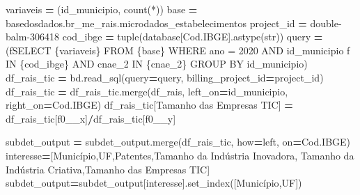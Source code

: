 \documentclass[
  12,
  dvipsnames]{article}
\newenvironment{Shaded}{\begin{snugshade}}{\end{snugshade}}
\newcommand{\BuiltInTok}[1]{#1}
\newcommand{\NormalTok}[1]{#1}
\newcommand{\OperatorTok}[1]{\textcolor[rgb]{0.81,0.36,0.00}{\textbf{#1}}}
\newcommand{\SpecialCharTok}[1]{\textcolor[rgb]{0.00,0.00,0.00}{#1}}
\newcommand{\SpecialStringTok}[1]{\textcolor[rgb]{0.31,0.60,0.02}{#1}}
\newcommand{\StringTok}[1]{\textcolor[rgb]{0.31,0.60,0.02}{#1}}
\begin{document}
\begin{Shaded}
\begin{Highlighting}[]
\NormalTok{variaveis }\OperatorTok{=}\NormalTok{ (}\StringTok{\textquotesingle{}id\_municipio, count(*)\textquotesingle{}}\NormalTok{)}
\NormalTok{base }\OperatorTok{=} \StringTok{\textquotesingle{}\textasciigrave{}basedosdados.br\_me\_rais.microdados\_estabelecimentos\textasciigrave{}\textquotesingle{}}
\NormalTok{project\_id }\OperatorTok{=} \StringTok{\textquotesingle{}double{-}balm{-}306418\textquotesingle{}}
\NormalTok{cod\_ibge }\OperatorTok{=} \BuiltInTok{tuple}\NormalTok{(database[}\StringTok{\textquotesingle{}Cod.IBGE\textquotesingle{}}\NormalTok{].astype(}\BuiltInTok{str}\NormalTok{))}
\NormalTok{query }\OperatorTok{=}\NormalTok{ (}\SpecialStringTok{f\textquotesingle{}SELECT }\SpecialCharTok{\{}\NormalTok{variaveis}\SpecialCharTok{\}}\SpecialStringTok{ FROM }\SpecialCharTok{\{}\NormalTok{base}\SpecialCharTok{\}}\SpecialStringTok{ WHERE ano = 2020 AND id\_municipio\textquotesingle{}} 
         \SpecialStringTok{f\textquotesingle{} IN }\SpecialCharTok{\{}\NormalTok{cod\_ibge}\SpecialCharTok{\}}\SpecialStringTok{ AND cnae\_2 IN }\SpecialCharTok{\{}\NormalTok{cnae\_2}\SpecialCharTok{\}}\SpecialStringTok{ GROUP BY id\_municipio\textquotesingle{}}\NormalTok{)}
\NormalTok{df\_rais\_tic }\OperatorTok{=}\NormalTok{ bd.read\_sql(query}\OperatorTok{=}\NormalTok{query, billing\_project\_id}\OperatorTok{=}\NormalTok{project\_id)}
\NormalTok{df\_rais\_tic }\OperatorTok{=}\NormalTok{ df\_rais\_tic.merge(df\_rais, left\_on}\OperatorTok{=}\StringTok{\textquotesingle{}id\_municipio\textquotesingle{}}\NormalTok{, right\_on}\OperatorTok{=}\StringTok{\textquotesingle{}Cod.IBGE\textquotesingle{}}\NormalTok{)}
\NormalTok{df\_rais\_tic[}\StringTok{\textquotesingle{}Tamanho das Empresas TIC\textquotesingle{}}\NormalTok{] }\OperatorTok{=}\NormalTok{ df\_rais\_tic[}\StringTok{\textquotesingle{}f0\_\_x\textquotesingle{}}\NormalTok{]}\OperatorTok{/}\NormalTok{df\_rais\_tic[}\StringTok{\textquotesingle{}f0\_\_y\textquotesingle{}}\NormalTok{]}

\NormalTok{subdet\_output }\OperatorTok{=}\NormalTok{ subdet\_output.merge(df\_rais\_tic, how}\OperatorTok{=}\StringTok{\textquotesingle{}left\textquotesingle{}}\NormalTok{, on}\OperatorTok{=}\StringTok{\textquotesingle{}Cod.IBGE\textquotesingle{}}\NormalTok{)}
\NormalTok{interesse}\OperatorTok{=}\NormalTok{[}\StringTok{\textquotesingle{}Município\textquotesingle{}}\NormalTok{,}\StringTok{\textquotesingle{}UF\textquotesingle{}}\NormalTok{,}\StringTok{\textquotesingle{}Patentes\textquotesingle{}}\NormalTok{,}\StringTok{\textquotesingle{}Tamanho da Indústria Inovadora\textquotesingle{}}\NormalTok{,}
           \StringTok{\textquotesingle{}Tamanho da Indústria Criativa\textquotesingle{}}\NormalTok{,}\StringTok{\textquotesingle{}Tamanho das Empresas TIC\textquotesingle{}}\NormalTok{]}
\NormalTok{subdet\_output}\OperatorTok{=}\NormalTok{subdet\_output[interesse].set\_index([}\StringTok{\textquotesingle{}Município\textquotesingle{}}\NormalTok{,}\StringTok{\textquotesingle{}UF\textquotesingle{}}\NormalTok{])}


\end{Highlighting}
\end{Shaded}
\end{document}

